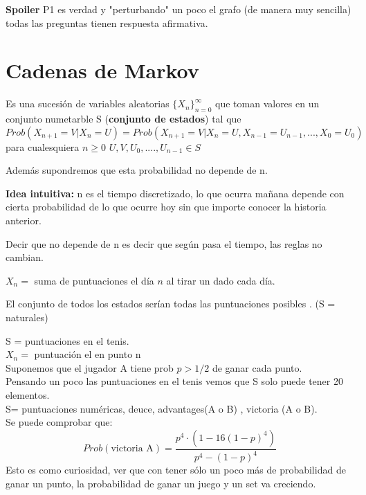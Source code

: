 \textbf{Spoiler} P1 es verdad y "perturbando" un poco el grafo (de manera muy sencilla) todas las preguntas tienen respuesta afirmativa.



\section{Cadenas de Markov}

\begin{defn}
	Es una sucesión de variables aleatorias $\{X_n\}_{n=0}^{\infty}$ que toman valores en un conjunto numetarble S (\textbf{conjunto de estados}) tal que
	$$Prob(X_{n+1} = V | X_n = U) = Prob(X_{n+1} = V | X_n =U , X_{n-1} = U_{n-1} , ... , X_0 = U_0)$$
	para cualesquiera $n \geq 0$ $U,V,U_0,.... ,U_{n-1} \in S$
\end{defn}


\obs Además supondremos que esta probabilidad no depende de n.


\textbf{Idea intuitiva: } n es el tiempo discretizado, lo que ocurra mañana depende con cierta probabilidad de lo que ocurre hoy sin que importe conocer la historia anterior.

Decir que no depende de n es decir que según pasa el tiempo, las reglas no cambian.

\begin{example}
	$X_n =$ suma de puntuaciones el día $n$ al tirar un dado cada día.

	El conjunto de todos los estados serían todas las puntuaciones posibles . (S = naturales)
\end{example}

\begin{example}[2]
	S = puntuaciones en el tenis.\\
	$X_n =$ puntuación el en punto n\\
	Suponemos que el jugador A tiene prob $p > 1/2$ de ganar cada punto.\\
	Pensando un poco las puntuaciones en el tenis vemos que S solo puede tener 20 elementos.\\
	S= puntuaciones numéricas, deuce, advantages(A o B) , victoria (A o B).\\
	Se puede comprobar que:
	$$Prob(\text{victoria A}) = \frac{p^4 \cdot(1- 16(1-p)^4)}{p^4 - (1-p)^4}$$
	Esto es como curiosidad, ver que con tener sólo un poco más de probabilidad de ganar un punto, la probabilidad de ganar un juego y un set va creciendo.
\end{example}




